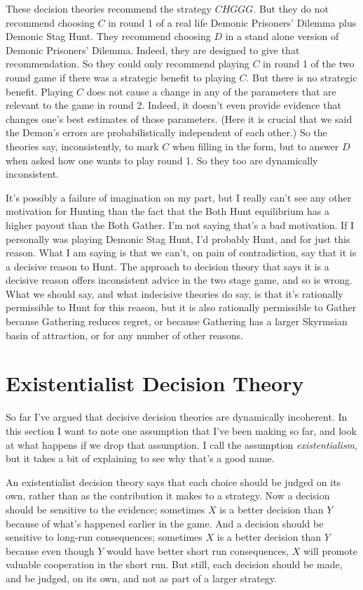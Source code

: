 \documentclass[
  12pt,
]{article}
\begin{document}
These decision theories recommend the strategy \(CHGGG\). But they do
not recommend choosing \(C\) in round 1 of a real life Demonic
Prisoners' Dilemma plus Demonic Stag Hunt. They recommend choosing \(D\)
in a stand alone version of Demonic Prisoners' Dilemma. Indeed, they are
designed to give that recommendation. So they could only recommend
playing \(C\) in round 1 of the two round game if there was a strategic
benefit to playing \(C\). But there is no strategic benefit. Playing
\(C\) does not cause a change in any of the parameters that are relevant
to the game in round 2. Indeed, it doesn't even provide evidence that
changes one's best estimates of those parameters. (Here it is crucial
that we said the Demon's errors are probabilistically independent of
each other.) So the theories say, inconsistently, to mark \(C\) when
filling in the form, but to answer \(D\) when asked how one wants to
play round 1. So they too are dynamically inconsistent.

It's possibly a failure of imagination on my part, but I really can't
see any other motivation for Hunting than the fact that the Both Hunt
equilibrium has a higher payout than the Both Gather. I'm not saying
that's a bad motivation. If I personally was playing Demonic Stag Hunt,
I'd probably Hunt, and for just this reason. What I am saying is that we
can't, on pain of contradiction, say that it is a decisive reason to
Hunt. The approach to decision theory that says it is a decisive reason
offers inconsistent advice in the two stage game, and so is wrong. What
we should say, and what indecisive theories do say, is that it's
rationally permissible to Hunt for this reason, but it is also
rationally permissible to Gather because Gathering reduces regret, or
because Gathering has a larger Skyrmsian basin of attraction, or for any
number of other reasons.

\hypertarget{existentialist-decision-theory}{%
\section{Existentialist Decision
Theory}\label{existentialist-decision-theory}}

So far I've argued that decisive decision theories are dynamically
incoherent. In this section I want to note one assumption that I've been
making so far, and look at what happens if we drop that assumption. I
call the assumption \emph{existentialism}, but it takes a bit of
explaining to see why that's a good name.

An existentialist decision theory says that each choice should be judged
on its own, rather than as the contribution it makes to a strategy. Now
a decision should be sensitive to the evidence; sometimes \(X\) is a
better decision than \(Y\) because of what's happened earlier in the
game. And a decision should be sensitive to long-run consequences;
sometimes \(X\) is a better decision than \(Y\) because even though
\(Y\) would have better short run consequences, \(X\) will promote
valuable cooperation in the short run. But still, each decision should
be made, and be judged, on its own, and not as part of a larger
strategy.
\end{document}

